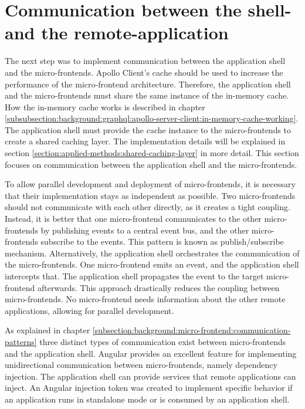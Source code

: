 \section{Communication between the shell- and the remote-application}\label{section:applied-methods:communication-shell-remote}

The next step was to implement communication between the application shell and the micro-frontends. Apollo Client's cache should be used to increase the performance of the micro-frontend architecture. Therefore, the application shell and the micro-frontends must share the same instance of the in-memory cache. How the in-memory cache works is described in chapter  \ref{subsubsection:background:graphql:apollo-server-client:in-memory-cache-working}. The application shell must provide the cache instance to the micro-frontends to create a shared caching layer. The implementation details will be explained in section \ref{section:applied-methods:shared-caching-layer} in more detail. This section focuses on communication between the application shell and the micro-frontends.

\bigskip

\noindent To allow parallel development and deployment of micro-frontends, it is necessary that their implementation stays as independent as possible. Two micro-frontends should not communicate with each other directly, as it creates a tight coupling. Instead, it is better that one micro-frontend communicates to the other micro-frontends by publishing events to a central event bus, and the other micro-frontends subscribe to the events. This pattern is known as publish/subscribe mechanism. Alternatively, the application shell orchestrates the communication of the micro-frontends. One micro-frontend emits an event, and the application shell intercepts that. The application shell propagates the event to the target micro-frontend afterwards. This approach drastically reduces the coupling between micro-frontends. No micro-frontend needs information about the other remote applications, allowing for parallel development.

\bigskip

\noindent As explained in chapter \ref{subsection:background:micro-frontend:communication-patterns} three distinct types of communication exist between micro-frontends and the application shell. Angular provides an excellent feature for implementing unidirectional communication between micro-frontends, namely dependency injection. The application shell can provide services that remote applications can inject. An Angular injection token was created to implement specific behavior if an application runs in standalone mode or is consumed by an application shell.

